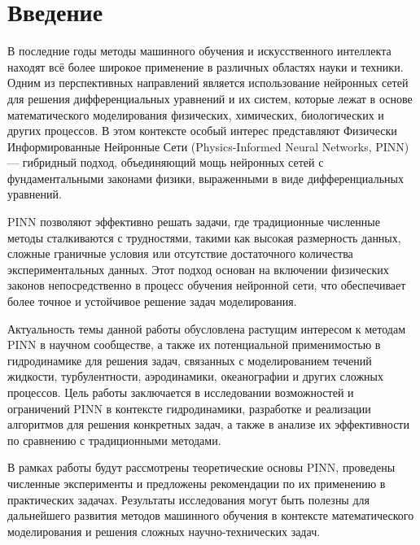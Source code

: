 \chapter{Введение}

В последние годы методы машинного обучения и искусственного интеллекта находят всё
более широкое применение в различных областях науки и техники. Одним из перспективных
направлений является использование нейронных сетей для решения дифференциальных
уравнений и их систем, которые лежат в основе математического моделирования физических,
химических, биологических и других процессов. В этом контексте особый интерес представляют
Физически Информированные Нейронные Сети (Physics-Informed Neural Networks, PINN) —
гибридный подход, объединяющий мощь нейронных сетей с фундаментальными законами физики,
выраженными в виде дифференциальных уравнений.

PINN позволяют эффективно решать задачи, где традиционные численные методы сталкиваются
с трудностями, такими как высокая размерность данных, сложные граничные условия или
отсутствие достаточного количества экспериментальных данных. Этот подход основан на
включении физических законов непосредственно в процесс обучения нейронной сети, что
обеспечивает более точное и устойчивое решение задач моделирования.

Актуальность темы данной работы обусловлена растущим интересом к методам PINN в
научном сообществе, а также их потенциальной применимостью в гидродинамике для
решения задач, связанных с моделированием течений жидкости, турбулентности,
аэродинамики, океанографии и других сложных процессов. Цель работы заключается в
исследовании возможностей и ограничений PINN в контексте гидродинамики, разработке и
реализации алгоритмов для решения конкретных задач, а также в анализе их эффективности
по сравнению с традиционными методами.

В рамках работы будут рассмотрены теоретические основы PINN, проведены численные
эксперименты и предложены рекомендации по их применению в практических задачах.
Результаты исследования могут быть полезны для дальнейшего развития методов машинного
обучения в контексте математического моделирования и решения сложных научно-технических задач.


